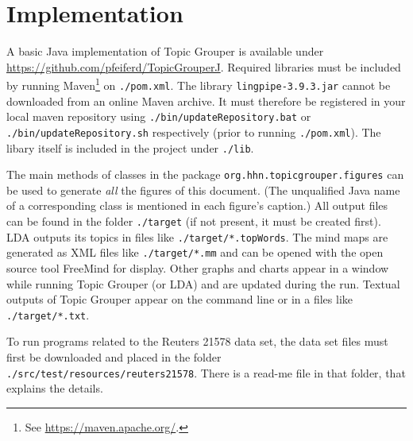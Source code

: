 \documentclass[10pt, a4paper, oneside]{article}
\begin{document}
\section{Implementation}

A basic Java implementation of Topic Grouper is available under\\
\href{https://github.com/pfeiferd/TopicGrouperJ}{https://github.com/pfeiferd/TopicGrouperJ}.
Required libraries must be included by running Maven\footnote{See \href{https://maven.apache.org/}{https://maven.apache.org/}.} on \texttt{./pom.xml}. The library \texttt{lingpipe-3.9.3.jar} cannot be downloaded from an online Maven archive. It must therefore be registered in your local maven repository using \texttt{./bin/updateRepository.bat} or \texttt{./bin/updateRepository.sh} respectively (prior to running \texttt{./pom.xml}).
The libary itself is included in the project under \texttt{./lib}.

The main methods of classes in the package \texttt{org.hhn.topicgrouper.figures} can be used to generate \emph{all} the figures of this document.
(The unqualified Java name of a corresponding class is mentioned in each figure's caption.)
All output files can be found in the folder \texttt{./target} (if not present, it must be created first).
LDA outputs its topics in files like \texttt{./target/*.topWords}.
The mind maps are generated as XML files like \texttt{./target/*.mm} and can be opened with the open source tool FreeMind for display.
Other graphs and charts appear in a window while running Topic Grouper (or LDA) and are updated during the run.
Textual outputs of Topic Grouper appear on the command line or in a files like \texttt{./target/*.txt}.

To run programs related to the Reuters 21578 data set, the data set files must first be downloaded and placed in the folder
\texttt{./src/test/resources/reuters21578}. There is a read-me file in that folder, that explains the details.

\nocite{*} %
\end{document}
